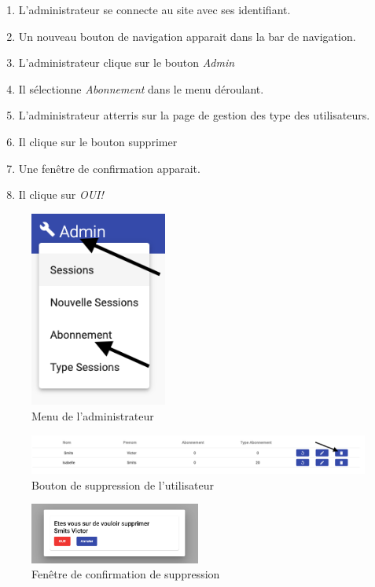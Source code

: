 \begin{enumerate}
	\item L'administrateur se connecte au site avec ses identifiant. 
	\item Un nouveau bouton de navigation apparait dans la bar de navigation. 
	\item L'administrateur clique sur le bouton \textit{Admin}
	\item Il sélectionne \textit{Abonnement} dans le menu déroulant. 
	\item L'administrateur atterris sur la page de gestion des type des utilisateurs. 
	\item Il clique sur le bouton supprimer
	\item Une fenêtre de confirmation apparait. 
	\item Il clique sur \textit{OUI!} 
\end{enumerate}

\newpage
\begin{figure}[h]
	\includegraphics[width=0.4\textwidth,center]{Figures/us15-1}
	\caption{Menu de l'administrateur}
\end{figure}

\vspace{\baselineskip}
\begin{figure}[h]
	\includegraphics[width=\textwidth,center]{Figures/us15-2}
	\caption{Bouton de suppression de l'utilisateur}
\end{figure}

\vspace{\baselineskip}
\begin{figure}[h]
	\includegraphics[width=0.5\textwidth,center]{Figures/us15-3}
	\caption{Fenêtre de confirmation de suppression}
\end{figure}
